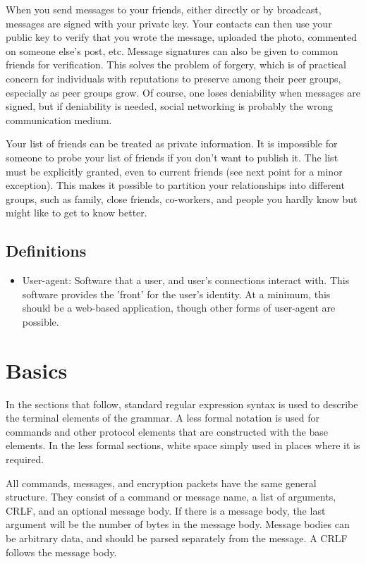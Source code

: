 \documentclass[letterpaper,11pt,oneside]{article}
\begin{document}
When you send messages to your friends, either directly or by broadcast,
messages are signed with your private key. Your contacts can then use your
public key to verify that you wrote the message, uploaded the photo, commented
on someone else's post, etc. Message signatures can also be given to common
friends for verification. This solves the problem of forgery, which is of
practical concern for individuals with reputations to preserve among their peer
groups, especially as peer groups grow. Of course, one loses deniability when
messages are signed, but if deniability is needed, social networking is
probably the wrong communication medium.

Your list of friends can be treated as private information. It is impossible
for someone to probe your list of friends if you don't want to publish it. The
list must be explicitly granted, even to current friends (see next point for a
minor exception). This makes it possible to partition your relationships into
different groups, such as family, close friends, co-workers, and people you
hardly know but might like to get to know better.

\subsection{Definitions}

\begin{itemize}

\item User-agent: Software that a user, and user's connections interact with.
This software provides the 'front' for the user's identity. At a minimum, this
should be a web-based application, though other forms of user-agent are
possible.

\end{itemize}

\section{Basics}

In the sections that follow, standard regular expression syntax is used to
describe the terminal elements of the grammar. A less formal notation is used
for commands and other protocol elements that are constructed with the base
elements. In the less formal sections, white space simply used in places where
it is required.

All commands, messages, and encryption packets have the same general structure.
They consist of a command or message name, a list of arguments, CRLF, and an
optional message body. If there is a message body, the last argument will be
the number of bytes in the message body. Message bodies can be arbitrary data,
and should be parsed separately from the message. A CRLF follows the message
body.
\end{document}
